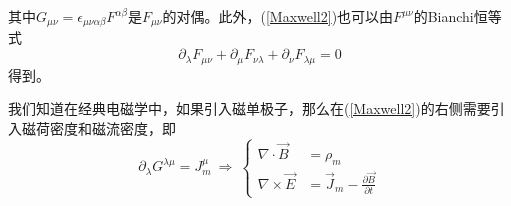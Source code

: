 \begin{itemize}
        其中$G_{\mu\nu}=\epsilon_{\mu\nu\alpha\beta}F^{\alpha\beta}$是$F_{\mu\nu}$的对偶。此外，(\ref{Maxwell2})也可以由$F^{\mu\nu}$的Bianchi恒等式$$\partial_\lambda F_{\mu\nu}+\partial_\mu F_{\nu\lambda}+\partial_\nu F_{\lambda\mu}=0$$得到。

        我们知道在经典电磁学中，如果引入磁单极子，那么在(\ref{Maxwell2})的右侧需要引入磁荷密度和磁流密度，即
        \begin{equation}
            \partial_\lambda G^{\lambda\mu}=J_m^\mu
            \ \Rightarrow\ \left\{
                \begin{split}
                    \nabla\cdot\vec{B}&=\rho_m \\
                    \nabla\times\vec{E}&=\vec{J}_m-\frac{\partial\vec{B}}{\partial t}
                \end{split}
            \right.
        \end{equation}


\end{itemize}